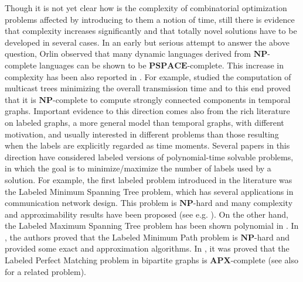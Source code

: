 \documentclass[oribibl, 11pt]{llncs}
\newcommand{\rem}{\mathbf}
\begin{document}
Though it is not yet clear how is the complexity of combinatorial optimization problems affected by introducing to them a notion of time, still there is evidence that complexity increases significantly and that totally novel solutions have to be developed in several cases. In an early but serious attempt to answer the above question, Orlin \cite{Or81} observed that many dynamic languages derived from $\rem{NP}$-complete languages can be shown to be $\rem{PSPACE}$-complete. This increase in complexity has been also reported in \cite{BF03,XFJ03}. For example, \cite{BF03} studied the computation of multicast trees minimizing the overall transmission time and to this end proved that it is $\rem{NP}$-complete to compute strongly connected components in temporal graphs. Important evidence to this direction comes also from the rich literature on labeled graphs, a more general model than temporal graphs, with different motivation, and usually interested in different problems than those resulting when the labels are explicitly regarded as time moments. Several papers in this direction have considered labeled versions of polynomial-time solvable problems, in which the goal is to minimize/maximize the number of labels used by a solution. For example, the first labeled problem introduced in the literature was the {\sc Labeled Minimum Spanning Tree} problem, which has several applications in communication network design. This problem is $\rem{NP}$-hard and many complexity and approximability results have been proposed (see e.g. \cite{BL97,KW98}). On the other hand, the {\sc Labeled Maximum Spanning Tree} problem has been shown polynomial in \cite{BL97}. In \cite{BLWZ05}, the authors proved that the {\sc Labeled Minimum Path} problem is $\rem{NP}$-hard and provided some exact and approximation algorithms. In \cite{Mo05}, it was proved that the {\sc Labeled Perfect Matching} problem in bipartite graphs is $\rem{APX}$-complete (see also \cite{TIR78} for a related problem). 
\end{document}
